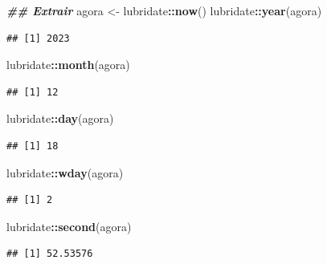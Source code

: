 \documentclass[
]{article}
\newenvironment{Shaded}{\begin{snugshade}}{\end{snugshade}}
\newcommand{\DocumentationTok}[1]{\textcolor[rgb]{0.56,0.35,0.01}{\textbf{\textit{#1}}}}
\newcommand{\FunctionTok}[1]{\textcolor[rgb]{0.13,0.29,0.53}{\textbf{#1}}}
\newcommand{\NormalTok}[1]{#1}
\newcommand{\OtherTok}[1]{\textcolor[rgb]{0.56,0.35,0.01}{#1}}
\newcommand{\SpecialCharTok}[1]{\textcolor[rgb]{0.81,0.36,0.00}{\textbf{#1}}}
\begin{document}
\begin{Shaded}
\begin{Highlighting}[]
\DocumentationTok{\#\# Extrair}
\NormalTok{agora }\OtherTok{\textless{}{-}}\NormalTok{ lubridate}\SpecialCharTok{::}\FunctionTok{now}\NormalTok{()}
\NormalTok{lubridate}\SpecialCharTok{::}\FunctionTok{year}\NormalTok{(agora)}
\end{Highlighting}
\end{Shaded}

\begin{verbatim}
## [1] 2023
\end{verbatim}

\begin{Shaded}
\begin{Highlighting}[]
\NormalTok{lubridate}\SpecialCharTok{::}\FunctionTok{month}\NormalTok{(agora)}
\end{Highlighting}
\end{Shaded}

\begin{verbatim}
## [1] 12
\end{verbatim}

\begin{Shaded}
\begin{Highlighting}[]
\NormalTok{lubridate}\SpecialCharTok{::}\FunctionTok{day}\NormalTok{(agora)}
\end{Highlighting}
\end{Shaded}

\begin{verbatim}
## [1] 18
\end{verbatim}

\begin{Shaded}
\begin{Highlighting}[]
\NormalTok{lubridate}\SpecialCharTok{::}\FunctionTok{wday}\NormalTok{(agora)}
\end{Highlighting}
\end{Shaded}

\begin{verbatim}
## [1] 2
\end{verbatim}

\begin{Shaded}
\begin{Highlighting}[]
\NormalTok{lubridate}\SpecialCharTok{::}\FunctionTok{second}\NormalTok{(agora)}
\end{Highlighting}
\end{Shaded}

\begin{verbatim}
## [1] 52.53576
\end{verbatim}
\end{document}
